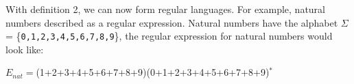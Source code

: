 With definition 2, we can now form regular languages. For example, natural numbers described as a regular expression. Natural numbers have the alphabet $\Sigma$ = \{{\tt 0,1,2,3,4,5,6,7,8,9}\}, the regular expression for natural numbers would look like:
\begin{center}
$E_{nat} = $(1+2+3+4+5+6+7+8+9)(0+1+2+3+4+5+6+7+8+9)$^*$
\end{center}
